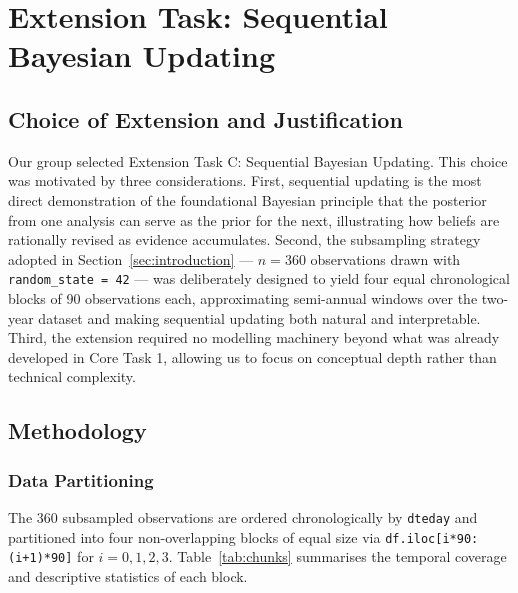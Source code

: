 \section{Extension Task: Sequential Bayesian Updating}
\label{sec:extension}

\subsection{Choice of Extension and Justification}

Our group selected Extension Task C: Sequential Bayesian Updating. This choice was
motivated by three considerations. First, sequential updating is the most direct
demonstration of the foundational Bayesian principle that the posterior from one
analysis can serve as the prior for the next, illustrating how beliefs are rationally
revised as evidence accumulates. Second, the subsampling strategy adopted in
Section~\ref{sec:introduction} --- $n = 360$ observations drawn with
\texttt{random\_state = 42} --- was deliberately designed to yield four equal
chronological blocks of 90 observations each, approximating semi-annual windows
over the two-year dataset and making sequential updating both natural and
interpretable. Third, the extension required no modelling machinery beyond what was
already developed in Core Task 1, allowing us to focus on conceptual depth rather
than technical complexity.

\subsection{Methodology}

\subsubsection{Data Partitioning}

The 360 subsampled observations are ordered chronologically by \texttt{dteday} and
partitioned into four non-overlapping blocks of equal size via
\texttt{df.iloc[i*90:(i+1)*90]} for $i = 0, 1, 2, 3$.
Table~\ref{tab:chunks} summarises the temporal coverage and descriptive statistics
of each block.

